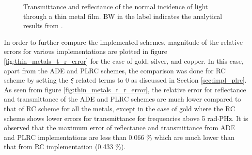 \begin{figure}[hp!]
  \begin{center}
  \end{center}
  \caption{Transmittance and reflectance of the normal incidence of light through a thin metal film. BW in the label indicates the analytical results from \citet{born_principles_1999}.}
  \label{fig:thin_metals_t_r}
\end{figure}

In order to further compare the implemented schemes, magnitude of the relative errors for various implementations are plotted in figure \ref{fig:thin_metals_t_r_error} for the case of gold, silver, and copper. In this case, apart from the ADE and PLRC schemes, the comparison was done for RC scheme by setting the $\xi$ related terms to 0 as discussed in Section \ref{sec:impl_plrc}. As seen from figure \ref{fig:thin_metals_t_r_error}, the relative error for reflectance and transmittance of the ADE and PLRC schemes are much lower compared to that of RC scheme for all the metals, except in the case of gold where the RC scheme shows lower errors for transmittance for frequencies above 5 rad$\cdot$PHz. It is observed that the maximum error of reflectance and transmittance from ADE and PLRC implementations are less than 0.066 \% which are much lower than that from RC implementation (0.433 \%).


